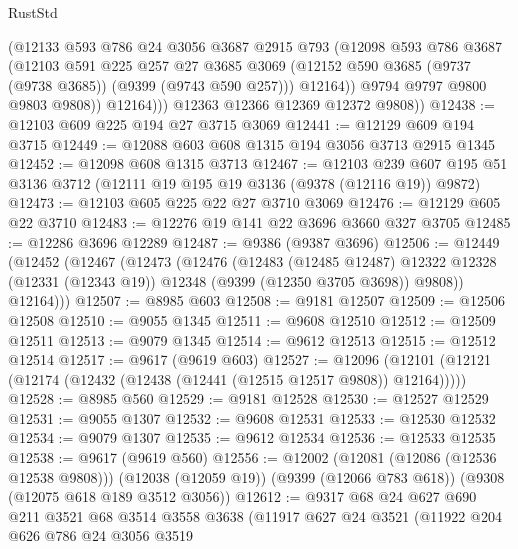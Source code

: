 \begin{lexlean}{RustStd}
\begin{coremodule}
                (@12133
                  @593
                  @786
                  @24
                  @3056
                  @3687
                  @2915
                  @793
                  (@12098
                    @593
                    @786
                    @3687
                    (@12103
                      @591
                      @225
                      @257
                      @27
                      @3685
                      @3069
                      (@12152 @590 @3685 (@9737 (@9738 @3685)) (@9399 (@9743 @590 @257)))
                      @12164))
                  @9794
                  @9797
                  @9800
                  @9803
                  @9808))
              @12164)))
        @12363
        @12366
        @12369
        @12372
        @9808))
@12438 := @12103 @609 @225 @194 @27 @3715 @3069
@12441 := @12129 @609 @194 @3715
@12449 := @12088 @603 @608 @1315 @194 @3056 @3713 @2915 @1345
@12452 := @12098 @608 @1315 @3713
@12467 := @12103
    @239
    @607
    @195
    @51
    @3136
    @3712
    (@12111 @19 @195 @19 @3136 (@9378 (@12116 @19)) @9872)
@12473 := @12103 @605 @225 @22 @27 @3710 @3069
@12476 := @12129 @605 @22 @3710
@12483 := @12276 @19 @141 @22 @3696 @3660 @327 @3705
@12485 := @12286 @3696 @12289
@12487 := @9386 (@9387 @3696)
@12506 := @12449
    (@12452
      (@12467
        (@12473
          (@12476
            (@12483
              (@12485 @12487)
              @12322
              @12328
              (@12331 (@12343 @19))
              @12348
              (@9399 (@12350 @3705 @3698))
              @9808))
          @12164)))
@12507 := @8985 @603
@12508 := @9181 @12507
@12509 := @12506 @12508
@12510 := @9055 @1345
@12511 := @9608 @12510
@12512 := @12509 @12511
@12513 := @9079 @1345
@12514 := @9612 @12513
@12515 := @12512 @12514
@12517 := @9617 (@9619 @603)
@12527 := @12096 (@12101 (@12121 (@12174 (@12432 (@12438 (@12441 (@12515 @12517 @9808)) @12164)))))
@12528 := @8985 @560
@12529 := @9181 @12528
@12530 := @12527 @12529
@12531 := @9055 @1307
@12532 := @9608 @12531
@12533 := @12530 @12532
@12534 := @9079 @1307
@12535 := @9612 @12534
@12536 := @12533 @12535
@12538 := @9617 (@9619 @560)
@12556 := @12002
    (@12081 (@12086 (@12536 @12538 @9808)))
    (@12038 (@12059 @19))
    (@9399 (@12066 @783 @618))
    (@9308 (@12075 @618 @189 @3512 @3056))
@12612 := @9317
    @68
    @24
    @627
    @690
    @211
    @3521
    @68
    @3514
    @3558
    @3638
    (@11917
      @627
      @24
      @3521
      (@11922
        @204
        @626
        @786
        @24
        @3056
        @3519

\end{coremodule}
\end{lexlean}
